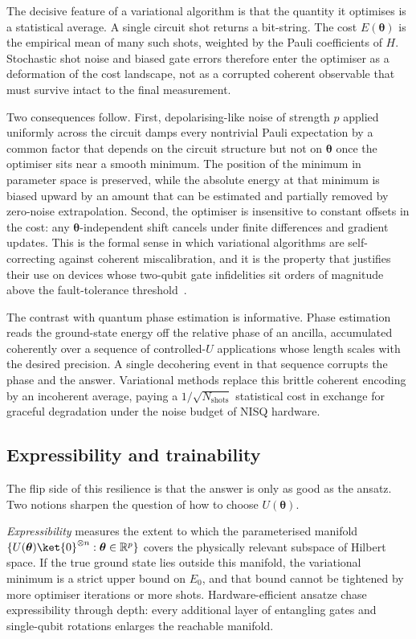 The decisive feature of a variational algorithm is that the quantity it
optimises is a statistical average. A single circuit shot returns a
bit-string. The cost $E(\bm{\theta})$ is the empirical mean of many such
shots, weighted by the Pauli coefficients of $H$. Stochastic shot noise
and biased gate errors therefore enter the optimiser as a deformation of
the cost landscape, not as a corrupted coherent observable that must
survive intact to the final measurement.

Two consequences follow. First, depolarising-like noise of strength $p$
applied uniformly across the circuit damps every nontrivial Pauli
expectation by a common factor that depends on the circuit structure but
not on $\bm{\theta}$ once the optimiser sits near a smooth minimum. The
position of the minimum in parameter space is preserved, while the
absolute energy at that minimum is biased upward by an amount that can be
estimated and partially removed by zero-noise extrapolation. Second, the
optimiser is insensitive to constant offsets in the cost: any
$\bm{\theta}$-independent shift cancels under finite differences and
gradient updates. This is the formal sense in which variational
algorithms are self-correcting against coherent miscalibration, and it is
the property that justifies their use on devices whose two-qubit gate
infidelities sit orders of magnitude above the fault-tolerance
threshold~\cite{mcclean2016,preskill2018}.

The contrast with quantum phase estimation is informative. Phase
estimation reads the ground-state energy off the relative phase of an
ancilla, accumulated coherently over a sequence of controlled-$U$
applications whose length scales with the desired precision. A single
decohering event in that sequence corrupts the phase and the answer.
Variational methods replace this brittle coherent encoding by an
incoherent average, paying a $1/\sqrt{N_{\mathrm{shots}}}$ statistical
cost in exchange for graceful degradation under the noise budget of NISQ
hardware.

\subsection{Expressibility and trainability}
\label{sec:vqa_expressibility}

The flip side of this resilience is that the answer is only as good as
the ansatz. Two notions sharpen the question of how to choose
$U(\bm{\theta})$.

\emph{Expressibility} measures the extent to which the parameterised
manifold $\{U(\bm{\theta})\ket{0}^{\otimes n} : \bm{\theta}\in\mathbb{R}^p\}$
covers the physically relevant subspace of Hilbert space. If the true
ground state lies outside this manifold, the variational minimum is a
strict upper bound on $E_0$, and that bound cannot be tightened by more
optimiser iterations or more shots. Hardware-efficient ansatze chase
expressibility through depth: every additional layer of entangling gates
and single-qubit rotations enlarges the reachable manifold.

